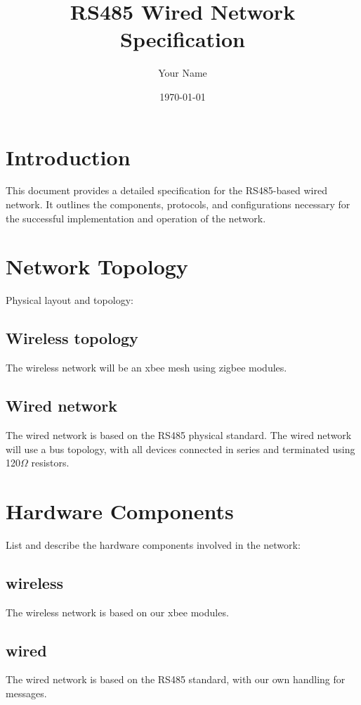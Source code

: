 \documentclass[a4paper,12pt]{article}
\begin{document}
	
	\title{RS485 Wired Network Specification}
	\author{Your Name}
	\date{\today}
	
	\maketitle
	
	\section{Introduction}
	
	This document provides a detailed specification for the RS485-based wired network. It outlines the components, protocols, and configurations necessary for the successful implementation and operation of the network.
	
	\section{Network Topology}
	
	Physical layout and topology:
	
	\subsection{Wireless topology}
	The wireless network will be an xbee mesh using zigbee modules.
	
	\subsection{Wired network}
	The wired network is based on the RS485 physical standard.
	The wired network will use a bus topology, with all devices connected in series and terminated using 120$\Omega$ resistors.
	
	\section{Hardware Components}
	
	List and describe the hardware components involved in the network:
	\subsection{wireless}
	The wireless network is based on our xbee modules.
	\subsection{wired}
	The wired network is based on the RS485 standard, with our own handling for messages.
\end{document}
